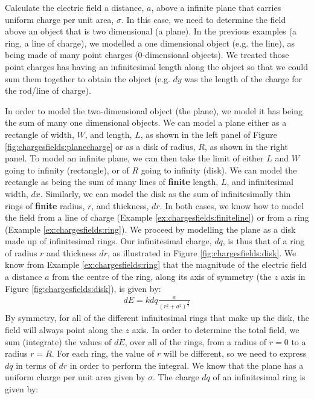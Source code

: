\begin{example}{Calculate the electric field a distance, $a$, above a infinite plane that carries uniform charge per unit area, $\sigma$.}
In this case, we need to determine the field above an object that is two dimensional (a plane). In the previous examples (a ring, a line of charge), we modelled a one dimensional object (e.g. the line), as being made of many point charges (0-dimensional objects). We treated those point charges has having an infinitesimal length along the object so that we could sum them together to obtain the object (e.g. $dy$ was the length of the charge for the rod/line of charge).
 
In order to model the two-dimensional object (the plane), we model it has being the sum of many one dimensional objects. We can model a plane either as a rectangle of width, $W$, and length, $L$, as shown in the left panel of Figure \ref{fig:chargesfields:planecharge} or as a disk of radius, $R$, as shown in the right panel. To model an infinite plane, we can then take the limit of either $L$ and $W$ going to infinity (rectangle), or of $R$ going to infinity (disk). We can model the rectangle as being the sum of many lines of \textbf{finite} length, $L$, and infinitesimal width, $dx$. Similarly, we can model the disk as the sum of infinitesimally thin rings of \textbf{finite} radius, $r$, and thickness, $dr$. In both cases, we know how to model the field from a line of charge (Example \ref{ex:chargesfields:finiteline}) or from a ring (Example \ref{ex:chargesfields:ring}). 
We proceed by modelling the plane as a disk made up of infinitesimal rings. Our infinitesimal charge, $dq$, is thus that of a ring of radius $r$ and thickness $dr$, as illustrated in Figure \ref{fig:chargesfields:disk}.
We know from Example \ref{ex:chargesfields:ring} that the magnitude of the electric field a distance $a$ from the centre of the ring, along its axis of symmetry (the $z$ axis in Figure \ref{fig:chargesfields:disk}), is given by:
\begin{align*}
dE = kdq\frac{a}{(r^2+a^2)^\frac{3}{2}} 
\end{align*}
By symmetry, for all of the different infinitesimal rings that make up the disk, the field will always point along the $z$ axis. In order to determine the total field, we sum (integrate) the values of $dE$, over all of the rings, from a radius of $r=0$ to a radius $r=R$. For each ring, the value of $r$ will be different, so we need to express $dq$ in terms of $dr$ in order to perform the integral. We know that the plane has a uniform charge per unit area given by $\sigma$. The charge $dq$ of an infinitesimal ring is given by:

\end{example}
